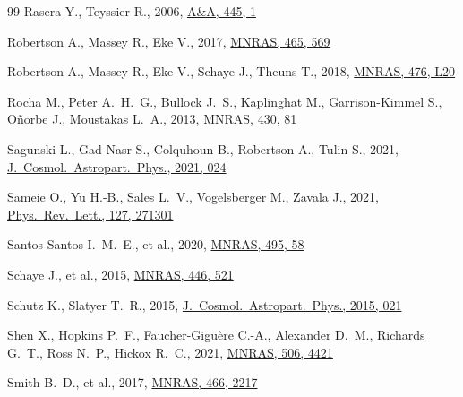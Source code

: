 \documentclass[fleqn,usenatbib]{mnras}
\begin{document}
\begin{thebibliography}{99}
Rasera Y., Teyssier R., 2006, \href{https://doi.org/10.1051/0004-6361:20053116}{A\&A, 445, 1}

Robertson A., Massey R., Eke V., 2017, \href{https://doi.org/10.1093/mnras/stw2670}{MNRAS, 465, 569}

Robertson A., Massey R., Eke V., Schaye J., Theuns T., 2018, \href{https://doi.org/10.1093/mnrasl/sly024}{MNRAS, 476, L20}

Rocha M., Peter A.~H.~G., Bullock J.~S., Kaplinghat M., Garrison-Kimmel S., O\~norbe J., Moustakas L.~A., 2013, \href{https://doi.org/10.1093/mnras/sts514}{MNRAS, 430, 81}

Sagunski L., Gad-Nasr S., Colquhoun B., Robertson A., Tulin S., 2021, \href{https://doi.org/10.1088/1475-7516/2021/01/024}{J.\ Cosmol.\ Astropart.\ Phys., 2021, 024}

Sameie O., Yu H.-B., Sales L.~V., Vogelsberger M., Zavala J., 2021, \href{https://doi.org/10.1103/PhysRevLett.127.271301}{Phys.\ Rev.\ Lett., 127, 271301}

Santos-Santos I.~M.~E., et al., 2020, \href{https://doi.org/10.1093/mnras/staa1072}{MNRAS, 495, 58}

Schaye J., et al., 2015, \href{https://doi.org/10.1093/mnras/stu2058}{MNRAS, 446, 521}

Schutz K., Slatyer T.~R., 2015, \href{https://doi.org/10.1088/1475-7516/2015/01/021}{J.\ Cosmol.\ Astropart.\ Phys., 2015, 021}

Shen X., Hopkins P.~F., Faucher-Gigu{\`e}re C.-A., Alexander D.~M., Richards G.~T., Ross N.~P., Hickox R.~C., 2021, \href{https://doi.org/10.1093/mnras/stab1992}{MNRAS, 506, 4421}

Smith B.~D., et al., 2017, \href{https://doi.org/10.1093/mnras/stw3291}{MNRAS, 466, 2217}


\end{thebibliography}
\end{document}
